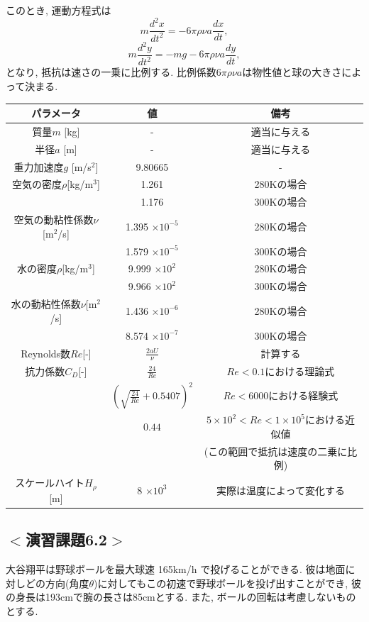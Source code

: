 このとき, 運動方程式は
\begin{equation}
m\frac{d^2 x}{dt^2}=-6\pi \rho \nu a \frac{dx}{dt},
\end{equation}
\begin{equation}
m\frac{d^2 y}{dt^2}=-mg-6\pi \rho \nu a \frac{dy}{dt},
\end{equation}
となり, 抵抗は速さの一乗に比例する.
比例係数$6\pi \rho \nu a$は物性値と球の大きさによって決まる.

\begin{table}[h]
\centering
\begin{tabular}{ccc}
\hline
パラメータ & 値 & 備考 \\
\hline
質量$m$ [kg] & - & 適当に与える \\ \hline
半径$a$ [m] & - & 適当に与える \\ \hline
重力加速度$g$ [m/s$^2$] & 9.80665 & - \\ \hline
空気の密度$\rho$[kg/m$^3$] & 1.261 & 280Kの場合 \\
 & 1.176 & 300Kの場合 \\ \hline
空気の動粘性係数$\nu$[m$^2$/s] & 1.395 $\times 10^{-5}$ & 280Kの場合 \\
 & 1.579 $\times 10^{-5}$ & 300Kの場合 \\ \hline
水の密度$\rho$[kg/m$^3$] & 9.999 $\times 10^2$ & 280Kの場合 \\
 & 9.966 $\times 10^2$ & 300Kの場合 \\ \hline
水の動粘性係数$\nu$[m$^2$/s] & 1.436 $\times 10^{-6}$ & 280Kの場合 \\
 & 8.574 $\times 10^{-7}$ & 300Kの場合 \\ \hline
Reynolds数$Re$[-] & $\frac{2aU}{\nu}$ & 計算する \\ \hline
抗力係数$C_D$[-] & $\frac{24}{Re}$ & $Re<0.1$における理論式 \\
& $(\sqrt{\frac{24}{Re}}+0.5407)^2$ & $Re< 6000$における経験式 \\
& $0.44$ & $5 \times 10^2 < Re < 1 \times 10^5$における近似値　\\
& & (この範囲で抵抗は速度の二乗に比例) \\ \hline
スケールハイト$H_\rho$[m] & 8 $\times 10^3$ & 実際は温度によって変化する \\ \hline
\end{tabular}
\end{table}
\fi %

\subsection*{$<$演習課題6.2$>$}
大谷翔平は野球ボールを最大球速 165km/h で投げることができる. 
彼は地面に対しどの方向(角度$\theta$)に対してもこの初速で野球ボールを投げ出すことができ, 
彼の身長は193cmで腕の長さは85cmとする. 
また, ボールの回転は考慮しないものとする. 

